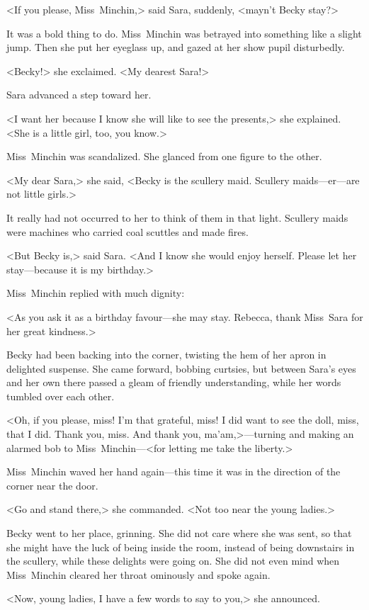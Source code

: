 <If you please, Miss~Minchin,> said Sara, suddenly, <mayn't Becky stay?>

It was a bold thing to do. Miss~Minchin was betrayed into something like a slight jump. Then she put her eyeglass up, and gazed at her show pupil disturbedly.

<Becky!> she exclaimed. <My dearest Sara!>

Sara advanced a step toward her.

<I want her because I know she will like to see the presents,> she explained. <She is a little girl, too, you know.>

Miss~Minchin was scandalized. She glanced from one figure to the other.

<My dear Sara,> she said, <Becky is the scullery maid. Scullery maids—er—are not little girls.>

It really had not occurred to her to think of them in that light. Scullery maids were machines who carried coal scuttles and made fires.

<But Becky is,> said Sara. <And I know she would enjoy herself. Please let her stay—because it is my birthday.>

Miss~Minchin replied with much dignity:

<As you ask it as a birthday favour—she may stay. Rebecca, thank Miss~Sara for her great kindness.>

Becky had been backing into the corner, twisting the hem of her apron in delighted suspense. She came forward, bobbing curtsies, but between Sara's eyes and her own there passed a gleam of friendly understanding, while her words tumbled over each other.

<Oh, if you please, miss! I'm that grateful, miss! I did want to see the doll, miss, that I did. Thank you, miss. And thank you, ma'am,>—turning and making an alarmed bob to Miss~Minchin—<for letting me take the liberty.>

Miss~Minchin waved her hand again—this time it was in the direction of the corner near the door.

<Go and stand there,> she commanded. <Not too near the young ladies.>

Becky went to her place, grinning. She did not care where she was sent, so that she might have the luck of being inside the room, instead of being downstairs in the scullery, while these delights were going on. She did not even mind when Miss~Minchin cleared her throat ominously and spoke again.

<Now, young ladies, I have a few words to say to you,> she announced.

